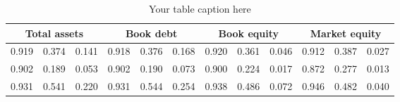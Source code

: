 
    \usepackage{booktabs} %
    \usepackage{graphicx} %

    \begin{table}[htbp]
      \centering
      \caption{Your table caption here}
      \label{tab:yourlabel}
    \begin{tabular}{lccccccccccc}
\toprule

    \multicolumn{3}{c}{Total assets} & \multicolumn{3}{c}{Book debt} & \multicolumn{3}{c}{Book equity} & \multicolumn{3}{c}{Market equity} \\
    \cmidrule(r{4pt}){1-3} \cmidrule(lr{4pt}){4-6} \cmidrule(lr{4pt}){7-9} \cmidrule(l{4pt}){10-12}
    \midrule
0.919 & 0.374 & 0.141 & 0.918 & 0.376 & 0.168 & 0.920 & 0.361 & 0.046 & 0.912 & 0.387 & 0.027 \\
0.902 & 0.189 & 0.053 & 0.902 & 0.190 & 0.073 & 0.900 & 0.224 & 0.017 & 0.872 & 0.277 & 0.013 \\
0.931 & 0.541 & 0.220 & 0.931 & 0.544 & 0.254 & 0.938 & 0.486 & 0.072 & 0.946 & 0.482 & 0.040 \\
\bottomrule
\end{tabular}

    \end{table}
    